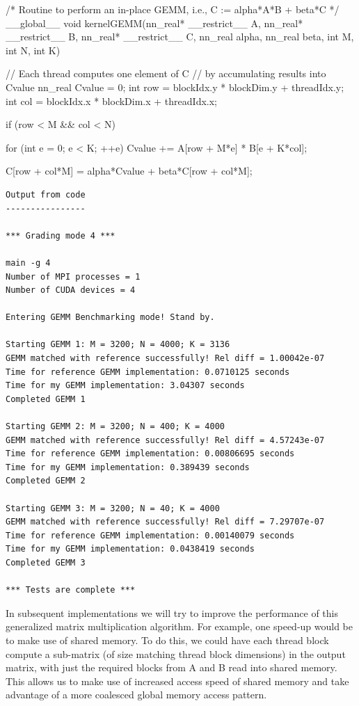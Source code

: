 \documentclass[12pt,letterpaper,twoside]{article}
\begin{document}
\begin{cpp}
/* 
Routine to perform an in-place GEMM, i.e., C := alpha*A*B + beta*C
*/
__global__ 
void kernelGEMM(nn_real* __restrict__ A, nn_real* __restrict__ B, 
        nn_real* __restrict__ C, nn_real alpha, nn_real beta, 
            int M, int N, int K) 
{
    // Each thread computes one element of C
    // by accumulating results into Cvalue
    nn_real Cvalue = 0;
    int row = blockIdx.y * blockDim.y + threadIdx.y;
    int col = blockIdx.x * blockDim.x + threadIdx.x;

    if (row < M && col < N) 
    {
        for (int e = 0; e < K; ++e) 
        Cvalue += A[row + M*e] * B[e +  K*col];	
        
    C[row + col*M] = alpha*Cvalue + beta*C[row + col*M];
    }
}
\end{cpp}

\begin{verbatim}
Output from code
----------------

*** Grading mode 4 ***

main -g 4
Number of MPI processes = 1
Number of CUDA devices = 4

Entering GEMM Benchmarking mode! Stand by.

Starting GEMM 1: M = 3200; N = 4000; K = 3136
GEMM matched with reference successfully! Rel diff = 1.00042e-07
Time for reference GEMM implementation: 0.0710125 seconds
Time for my GEMM implementation: 3.04307 seconds
Completed GEMM 1

Starting GEMM 2: M = 3200; N = 400; K = 4000
GEMM matched with reference successfully! Rel diff = 4.57243e-07
Time for reference GEMM implementation: 0.00806695 seconds
Time for my GEMM implementation: 0.389439 seconds
Completed GEMM 2

Starting GEMM 3: M = 3200; N = 40; K = 4000
GEMM matched with reference successfully! Rel diff = 7.29707e-07
Time for reference GEMM implementation: 0.00140079 seconds
Time for my GEMM implementation: 0.0438419 seconds
Completed GEMM 3

*** Tests are complete ***
\end{verbatim}

In subsequent implementations we will try to improve the performance of this 
generalized matrix multiplication algorithm. For example, one speed-up would be
to make use of shared memory. To do this, we could have each thread block compute
a sub-matrix (of size matching thread block dimensions) in the output matrix, with
just the required blocks from A and B read into shared memory. This allows us to 
make use of increased access speed of shared memory and take advantage of a more
coalesced global memory access pattern.
\end{document}
